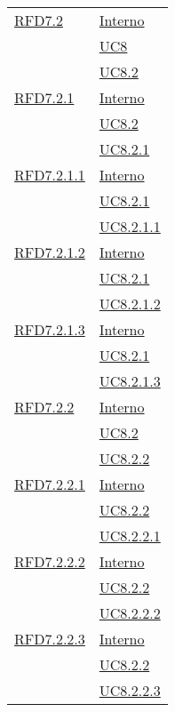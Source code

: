 \begin{longtable}{|>{\centering}m{5cm}|m{5cm}<{\centering}|}
\hyperlink{RFD7.2}{RFD7.2} & \hyperlink{Interno}{Interno}\\
& \hyperref[UC8]{UC8}\\
& \hyperref[UC8.2]{UC8.2}\\ \hline

\hyperlink{RFD7.2.1}{RFD7.2.1} & \hyperlink{Interno}{Interno}\\
& \hyperref[UC8.2]{UC8.2}\\
& \hyperref[UC8.2.1]{UC8.2.1}\\ \hline

\hyperlink{RFD7.2.1.1}{RFD7.2.1.1} & \hyperlink{Interno}{Interno}\\
& \hyperref[UC8.2.1]{UC8.2.1}\\
& \hyperref[UC8.2.1.1]{UC8.2.1.1}\\ \hline

\hyperlink{RFD7.2.1.2}{RFD7.2.1.2} & \hyperlink{Interno}{Interno}\\
& \hyperref[UC8.2.1]{UC8.2.1}\\
& \hyperref[UC8.2.1.2]{UC8.2.1.2}\\ \hline

\hyperlink{RFD7.2.1.3}{RFD7.2.1.3} & \hyperlink{Interno}{Interno}\\
& \hyperref[UC8.2.1]{UC8.2.1}\\
& \hyperref[UC8.2.1.3]{UC8.2.1.3}\\ \hline

\hyperlink{RFD7.2.2}{RFD7.2.2} & \hyperlink{Interno}{Interno}\\
& \hyperref[UC8.2]{UC8.2}\\
& \hyperref[UC8.2.2]{UC8.2.2}\\ \hline

\hyperlink{RFD7.2.2.1}{RFD7.2.2.1} & \hyperlink{Interno}{Interno}\\
& \hyperref[UC8.2.2]{UC8.2.2}\\
& \hyperref[UC8.2.2.1]{UC8.2.2.1}\\ \hline

\hyperlink{RFD7.2.2.2}{RFD7.2.2.2} & \hyperlink{Interno}{Interno}\\
& \hyperref[UC8.2.2]{UC8.2.2}\\
& \hyperref[UC8.2.2.2]{UC8.2.2.2}\\ \hline

\hyperlink{RFD7.2.2.3}{RFD7.2.2.3} & \hyperlink{Interno}{Interno}\\
& \hyperref[UC8.2.2]{UC8.2.2}\\
& \hyperref[UC8.2.2.3]{UC8.2.2.3}\\ \hline


\end{longtable}
